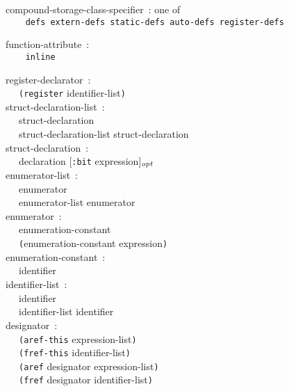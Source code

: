 \documentclass[a4]{article}
\def\|{\verb|} %|
\newcommand{\opt}{$_{{\it opt}}$}
\begin{document}
\noindent
compound-storage-class-specifier{\rm \ :} {\rm one of} \\ \tt
\|  | defs extern-defs static-defs auto-defs register-defs \\ \it

\noindent
function-attribute{\rm \ :} \\ \tt
\|  | inline \\ \it


\noindent
register-declarator{\rm \ :} \\
\|  | {\tt (register} identifier-list{\tt )} \\

\noindent
struct-declaration-list{\rm \ :} \\
\|  | struct-declaration \\
\|  | struct-declaration-list struct-declaration \\


\noindent
struct-declaration{\rm \ :} \\
\|  | declaration {\rm [}{\tt :bit} expression{\rm ]}\opt \\

\noindent
enumerator-list{\rm \ :} \\
\|  | enumerator \\
\|  | enumerator-list enumerator \\

\noindent
enumerator{\rm \ :} \\
\|  | enumeration-constant \\
\|  | {\tt (}enumeration-constant expression{\tt )}\\

\noindent
enumeration-constant{\rm \ :} \\
\|  | identifier \\

\noindent
identifier-list{\rm \ :} \\
\|  | identifier \\
\|  | identifier-list identifier \\

\noindent
designator{\rm \ :} \\
\|  | {\tt (aref-this} expression-list{\tt )} \\
\|  | {\tt (fref-this} identifier-list{\tt )} \\
\|  | {\tt (aref} designator expression-list{\tt )} \\
\|  | {\tt (fref} designator identifier-list{\tt )} \\
\end{document}
